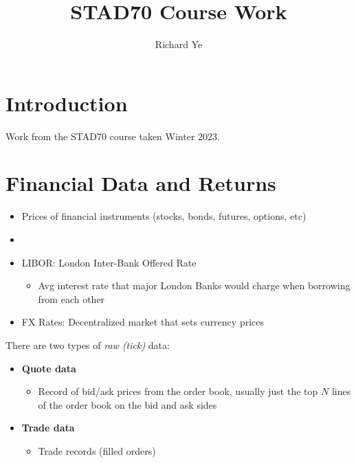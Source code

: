 \documentclass[
  oneside]{book}
\title{STAD70 Course Work}
\author{Richard Ye}
\date{}
\providecommand{\tightlist}{%
  \setlength{\itemsep}{0pt}\setlength{\parskip}{0pt}}
\begin{document}
\maketitle

{
\setcounter{tocdepth}{1}
\tableofcontents
}
\hypertarget{introduction}{%
\chapter{Introduction}\label{introduction}}

Work from the STAD70 course taken Winter 2023.

\hypertarget{financial-data-and-returns}{%
\chapter{Financial Data and Returns}\label{financial-data-and-returns}}

\begin{itemize}
\tightlist
\item
  Prices of financial instruments (stocks, bonds, futures, options, etc)
\item
\item
  LIBOR: London Inter-Bank Offered Rate

  \begin{itemize}
  \tightlist
  \item
    Avg interest rate that major London Banks would charge when borrowing from each other
  \end{itemize}
\item
  FX Rates: Decentralized market that sets currency prices
\end{itemize}

There are two types of \emph{raw (tick)} data:

\begin{itemize}
\tightlist
\item
  \textbf{Quote data}

  \begin{itemize}
  \tightlist
  \item
    Record of bid/ask prices from the order book, usually just the top \(N\) lines of the order book on the bid and ask sides
  \end{itemize}
\item
  \textbf{Trade data}

  \begin{itemize}
  \tightlist
  \item
    Trade records (filled orders)
  \end{itemize}
\end{itemize}
\end{document}
